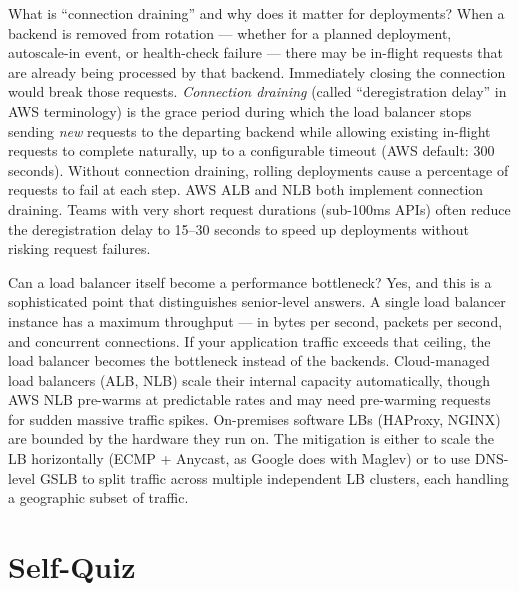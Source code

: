 \documentclass[11pt,a4paper]{article}
\begin{document}
\begin{curiobox}{What is ``connection draining'' and why does it matter for deployments?}
  When a backend is removed from rotation --- whether for a planned deployment, autoscale-in event,
  or health-check failure --- there may be in-flight requests that are already being processed by
  that backend. Immediately closing the connection would break those requests. \emph{Connection
  draining} (called ``deregistration delay'' in AWS terminology) is the grace period during which
  the load balancer stops sending \emph{new} requests to the departing backend while allowing
  existing in-flight requests to complete naturally, up to a configurable timeout (AWS default: 300
  seconds). Without connection draining, rolling deployments cause a percentage of requests to fail
  at each step. AWS ALB and NLB both implement connection draining. Teams with very short request
  durations (sub-100ms APIs) often reduce the deregistration delay to 15--30 seconds to speed up
  deployments without risking request failures.
\end{curiobox}

\begin{curiobox}{Can a load balancer itself become a performance bottleneck?}
  Yes, and this is a sophisticated point that distinguishes senior-level answers. A single load
  balancer instance has a maximum throughput --- in bytes per second, packets per second, and
  concurrent connections. If your application traffic exceeds that ceiling, the load balancer
  becomes the bottleneck instead of the backends. Cloud-managed load balancers (ALB, NLB) scale
  their internal capacity automatically, though AWS NLB pre-warms at predictable rates and may
  need pre-warming requests for sudden massive traffic spikes. On-premises software LBs (HAProxy,
  NGINX) are bounded by the hardware they run on. The mitigation is either to scale the LB
  horizontally (ECMP + Anycast, as Google does with Maglev) or to use DNS-level GSLB to split
  traffic across multiple independent LB clusters, each handling a geographic subset of traffic.
\end{curiobox}

\newpage
\section{Self-Quiz}
\end{document}
